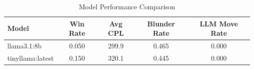 \begin{table}[h]
\centering
\caption{Model Performance Comparison}
\begin{tabular}{lcccc}
\toprule
Model & Win Rate & Avg CPL & Blunder Rate & LLM Move Rate \\
\midrule
llama3.1:8b & 0.050 & 299.9 & 0.465 & 0.000 \\
tinyllama:latest & 0.150 & 320.1 & 0.445 & 0.000 \\
\bottomrule
\end{tabular}
\end{table}